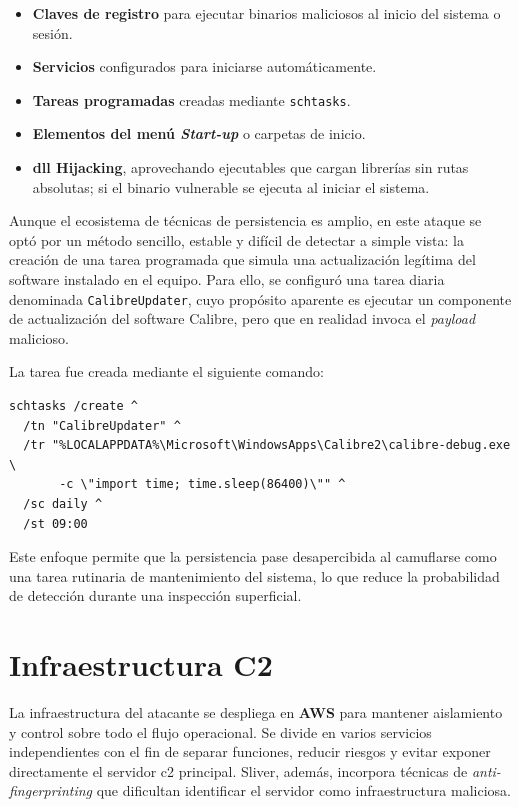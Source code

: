 \begin{itemize}
    \item \textbf{Claves de registro} para ejecutar binarios maliciosos al inicio del sistema o sesión.
    \item \textbf{Servicios} configurados para iniciarse automáticamente.
    \item \textbf{Tareas programadas} creadas mediante \texttt{schtasks}.
    \item \textbf{Elementos del menú \textit{Start-up}} o carpetas de inicio.
    \item \textbf{\acrshort{dll} Hijacking}, aprovechando ejecutables que cargan librerías sin rutas absolutas; si el binario vulnerable se ejecuta al iniciar el sistema.
\end{itemize}

Aunque el ecosistema de técnicas de persistencia es amplio, en este ataque se optó por un método sencillo, 
estable y difícil de detectar a simple vista: la creación de una tarea programada que simula una actualización 
legítima del software instalado en el equipo. Para ello, se configuró una tarea diaria denominada 
\texttt{CalibreUpdater}, cuyo propósito aparente es ejecutar un componente de actualización del software 
Calibre, pero que en realidad invoca el \textit{payload} malicioso.

La tarea fue creada mediante el siguiente comando:

\begin{verbatim}
schtasks /create ^
  /tn "CalibreUpdater" ^
  /tr "%LOCALAPPDATA%\Microsoft\WindowsApps\Calibre2\calibre-debug.exe \
       -c \"import time; time.sleep(86400)\"" ^
  /sc daily ^
  /st 09:00
\end{verbatim}


Este enfoque permite que la persistencia pase desapercibida al camuflarse como una tarea rutinaria de 
mantenimiento del sistema, lo que reduce la probabilidad de detección durante una inspección superficial.

\section{Infraestructura C2} \label{sec:c2}
\label{sec:infraestructura}

La infraestructura del atacante se despliega en \textbf{AWS} para mantener aislamiento y control sobre todo el flujo operacional. Se divide en varios servicios independientes con el fin de separar funciones, reducir riesgos y evitar exponer directamente el servidor \acrshort{c2} principal. Sliver, además, incorpora técnicas de \textit{anti-fingerprinting} que dificultan identificar el servidor como infraestructura maliciosa.

